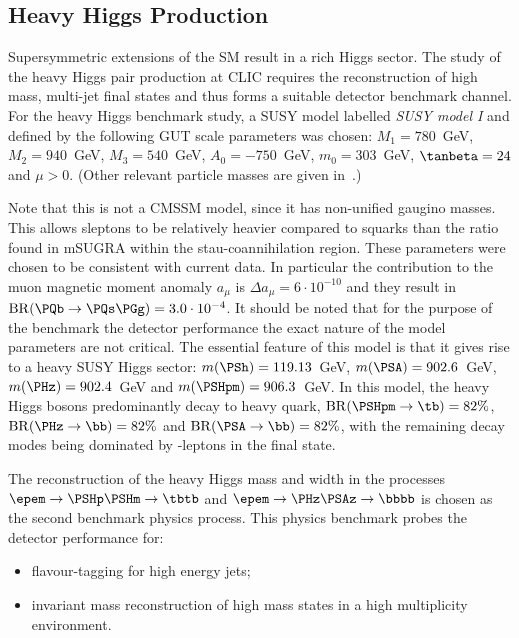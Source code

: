 \subsection{Heavy Higgs Production}
Supersymmetric extensions of the \acs{SM} result in a rich Higgs sector. The study
of the heavy Higgs pair production at CLIC requires the reconstruction of high mass,
multi-jet final states and thus forms a suitable detector benchmark channel. For
the heavy Higgs benchmark study, a SUSY model labelled \textit{\acs{SUSY}
  model I} and defined by the following \acs{GUT} scale
parameters was chosen: $M_1=780$~GeV, \mbox{$M_2=940$~GeV}, $M_3=540$~GeV,
\mbox{$A_0=-750$~GeV}, \mbox{$m_0=303$~GeV}, $\tanbeta=24$ and $\mu>0$. (Other
relevant particle masses are given in~\cite{lcd:2011-016}.)

Note that this is not a \acs{CMSSM} model,
since it has non-unified gaugino masses. This allows sleptons to be relatively
heavier compared to squarks than the ratio found in \acs{mSUGRA} within the
stau-coannihilation region. These parameters were chosen to be consistent with
current data. In particular the contribution to the muon magnetic moment
anomaly $a_\mu$ is $\Delta a_\mu = 6\cdot 10^{-10}$ and they result in
\mbox{$\mathrm{BR}(\PQb\rightarrow\PQs\PGg) = 3.0\cdot 10^{-4}$}. It should be noted that for
the purpose of the benchmark the detector performance the exact nature of the
model parameters are not critical. The essential feature of this model is that
it gives rise to a heavy \acs{SUSY} Higgs sector: $m(\PSh)=119.13$~GeV,
$m(\PSA)=902.6$~GeV, $m(\PHz)=902.4$~GeV and $m(\PSHpm)=906.3$~GeV. In this
model, the heavy Higgs bosons predominantly decay to heavy quark,
$\mathrm{BR}(\PSHpm\rightarrow \tb) = 82\%$, $\mathrm{BR}(\PHz\rightarrow \bb) =
82\%$ and $\mathrm{BR}(\PSA\rightarrow \bb) = 82\%$, with the remaining decay
modes being dominated by \PGt-leptons in the final state. 

The reconstruction of the heavy Higgs mass and width in the processes 
$\epem\rightarrow\PSHp\PSHm\rightarrow \tbtb$ and 
$\epem\rightarrow\PHz\PSAz\rightarrow \bbbb$ 
is chosen as the second benchmark physics process. This physics benchmark probes the detector performance for:
\begin{itemize}
   \item flavour-tagging for high energy jets;
   \item invariant mass reconstruction of high mass states in a high multiplicity environment.
\end{itemize}


